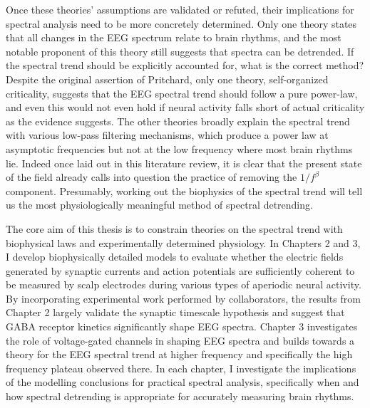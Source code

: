 Once these theories' assumptions are validated or refuted, their implications for spectral analysis need to be more concretely determined. Only one theory states that all changes in the EEG spectrum relate to brain rhythms, and the most notable proponent of this theory still suggests that spectra can be detrended. If the spectral trend should be explicitly accounted for, what is the correct method? Despite the original assertion of Pritchard, only one theory, self-organized criticality, suggests that the EEG spectral trend should follow a pure power-law, and even this would not even hold if neural activity falls short of actual criticality as the evidence suggests. The other theories broadly explain the spectral trend with various low-pass filtering mechanisms, which produce a power law at asymptotic frequencies but not at the low frequency where most brain rhythms lie. Indeed once laid out in this literature review, it is clear that the present state of the field already calls into question the practice of removing the $1/f^\beta$ component. Presumably, working out the biophysics of the spectral trend will tell us the most physiologically meaningful method of spectral detrending.

The core aim of this thesis is to constrain theories on the spectral trend with biophysical laws and experimentally determined physiology. In Chapters 2 and 3, I develop biophysically detailed models to evaluate whether the electric fields generated by synaptic currents and action potentials are sufficiently coherent to be measured by scalp electrodes during various types of aperiodic neural activity. By incorporating experimental work performed by collaborators, the results from Chapter 2 largely validate the synaptic timescale hypothesis and suggest that GABA receptor kinetics significantly shape EEG spectra. Chapter 3 investigates the role of voltage-gated channels in shaping EEG spectra and builds towards a theory for the EEG spectral trend at higher frequency and specifically the high frequency plateau observed there. In each chapter, I investigate the implications of the modelling conclusions for practical spectral analysis, specifically when and how spectral detrending is appropriate for accurately measuring brain rhythms.